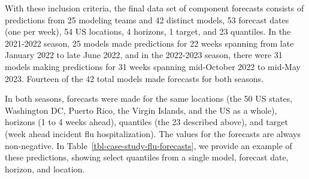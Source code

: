 \documentclass[
  article,
  shortnames,
  notitle]{jss}
\begin{document}
With these inclusion criteria, the final data set of component forecasts
consists of predictions from 25 modeling teams and 42 distinct models,
53 forecast dates (one per week), 54 US locations, 4 horizons, 1 target,
and 23 quantiles. In the 2021-2022 season, 25 models made predictions
for 22 weeks spanning from late January 2022 to late June 2022, and in
the 2022-2023 season, there were 31 models making predictions for 31
weeks spanning mid-October 2022 to mid-May 2023. Fourteen of the 42
total models made forecasts for both seasons.

In both seasons, forecasts were made for the same locations (the 50 US
states, Washington DC, Puerto Rico, the Virgin Islands, and the US as a
whole), horizons (1 to 4 weeks ahead), quantiles (the 23 described
above), and target (week ahead incident flu hospitalization). The values
for the forecasts are always non-negative. In
Table~\ref{tbl-case-study-flu-forecasts}, we provide an example of these
predictions, showing select quantiles from a single model, forecast
date, horizon, and location.
\end{document}

